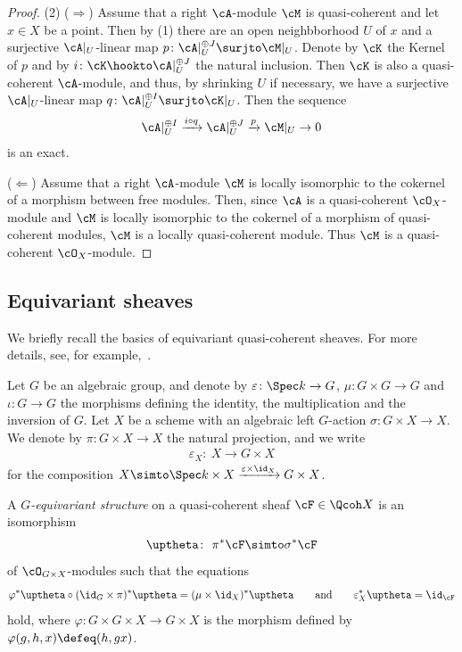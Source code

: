 \begin{prop}
\begin{proof}
 (2) ($\Rightarrow$) Assume that a right $\cA$-module $\cM$ is quasi-coherent and let $x\in X$ be a point. Then by (1) there are an open neighbborhood $U$ of $x$ and a surjective $\cA|_U$-linear map $p \colon \cA|_U^{\oplus J}\surjto \cM|_U$. Denote by $\cK$ the Kernel of $p$ and by $i\colon \cK\hookto \cA|_U^{\oplus J}$ the natural inclusion. Then $\cK$ is also a quasi-coherent $\cA$-module, and thus, by shrinking $U$ if necessary, we have a surjective $\cA|_U$-linear map $q \colon \cA|_U^{\oplus I}\surjto \cK|_U$. Then the sequence
 \begin{gather*}
 \cA|_U^{\oplus I}\xrightarrow{i \circ q}\cA|_U^{\oplus J}\xrightarrow{p}\cM|_U\to 0
 \end{gather*}
is an exact.

($\Leftarrow$) Assume that a right $\cA$-module $\cM$ is locally isomorphic to the cokernel of a morphism between free modules. Then, since $\cA$ is a quasi-coherent $\cO_X$-module and $\cM$ is locally isomorphic to the cokernel of a morphism of quasi-coherent modules, $\cM$ is a locally quasi-coherent module. Thus $\cM$ is a quasi-coherent $\cO_X$-module.
 \end{proof}
\end{prop}

\subsection{Equivariant sheaves}\label{equiv section}
We briefly recall the basics of equivariant quasi-coherent sheaves. For more details, see, for example,~\cite[Section~2]{bfk}.

Let $G$ be an algebraic group, and denote by $\varepsilon\colon \Spec k\to G$, $\mu\colon G\times G\to G$ and $\iota\colon G\to G$ the morphisms defining the identity, the multiplication and the inversion of $G$.
Let $X$ be a scheme with an algebraic left $G$-action $\sigma\colon G\times X \to X$. We denote by $\pi\colon G\times X\to X$ the natural projection, and we write
\begin{gather*}
\varepsilon_X\colon\ X\to G\times X
\end{gather*}
for the composition $X\simto \Spec k\times X\xrightarrow{ \varepsilon\times \id_X}G\times X$. \begin{dfn}
A {\it $G$-equivariant structure} on a quasi-coherent sheaf $\cF\in \Qcoh X$ is an isomorphism
\begin{gather*}
\uptheta\colon\ \pi^*\cF\simto \sigma^*\cF
\end{gather*}
of $\cO_{G\times X}$-modules such that the equations
\begin{equation}\label{compati}
\varphi^*\uptheta\circ (\id_G\times\pi)^*\uptheta=(\mu\times\id_X )^*\uptheta \qquad\text{and}\qquad
\varepsilon_X^*\uptheta=\id_{\cF}
\end{equation}
hold, where $\varphi\colon G\times G\times X\to G\times X$ is the morphism defined by $\varphi(g,h,x)\defeq(h,gx)$.
\end{dfn}

